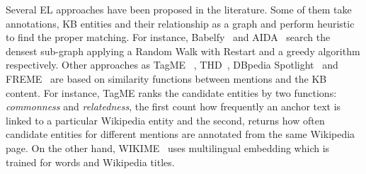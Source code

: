 \documentclass[sigconf]{acmart}
\begin{document}
Several EL approaches have been proposed in the literature. Some of them take annotations, KB entities and their relationship as a graph and perform heuristic to find the proper matching. For instance, Babelfy~\cite{0001RN14} and AIDA~\cite{HoffartYBFPSTTW11} search the densest sub-graph applying a Random Walk with Restart and a greedy algorithm respectively. Other approaches as TagME~\cite{FerraginaS10} , THD~\cite{DojchinovskiK13}, DBpedia Spotlight~\cite{MendesJGB11} and FREME~\cite{SasakiDN16} are based on similarity functions between mentions and the KB content. For instance, TagME ranks the candidate entities by two functions: \textit{commonness} and \textit{relatedness}, the first count how frequently an anchor text is linked to a particular Wikipedia entity and the second, returns how often candidate entities for different mentions are annotated from the same Wikipedia page. On the other hand, WIKIME~\cite{TsaiR16} uses multilingual embedding which is trained for words and Wikipedia titles. 

\end{document}
